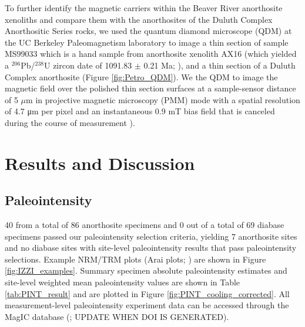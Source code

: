 \documentclass[draft]{agujournal2019}
\begin{document}
To further identify the magnetic carriers within the Beaver River anorthosite xenoliths and compare them with the anorthosites of the Duluth Complex Anorthositic Series rocks, we used the quantum diamond microscope (QDM) at the UC Berkeley Paleomagnetism laboratory to image a thin section of sample MS99033 which is a hand sample from anorthosite xenolith AX16 (which yielded a $^{206}$Pb/$^{238}$U zircon date of 1091.83 $\pm$ 0.21 Ma; ), and a thin section of a Duluth Complex anorthosite (Figure \ref{fig:Petro_QDM}). We the QDM to image the magnetic field over the polished thin section surfaces at a sample-sensor distance of 5 $\mu$m in projective magnetic microscopy (PMM) mode with a spatial resolution of 4.7 μm per pixel and an instantaneous 0.9 mT bias field that is canceled during the course of measurement \cite{Glenn2017a}).

\section*{Results and Discussion}
\subsection*{Paleointensity}

40 from a total of 86 anorthosite specimens and 0 out of a total of 69 diabase specimens passed our paleointensity selection criteria, yielding 7 anorthosite sites and no diabase sites with site-level paleointensity results that pass paleointensity selections. Example NRM/TRM plots (Arai plots; 
\cite{Arai1963a}) are shown in Figure \ref{fig:IZZI_examples}. Summary specimen absolute paleointensity estimates and site-level weighted mean paleointensity values are shown in Table \ref{tab:PINT_result} and are plotted in Figure \ref{fig:PINT_cooling_corrected}. All measurement-level paleointensity experiment data can be accessed through the MagIC database (\url{}; UPDATE WHEN DOI IS GENERATED). 
\end{document}
